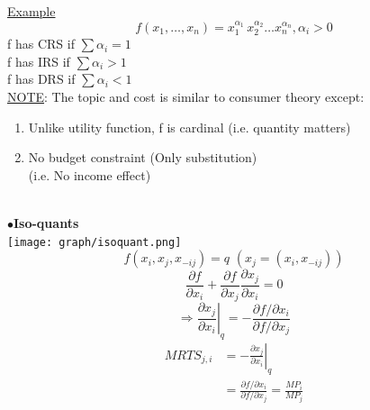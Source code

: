 \documentclass[letterpaper,13pt,single,pdftex]{scrartcl}
\begin{document}
\underline{Example}
\[f(x_1,\dots,x_n) = x_1^{\alpha_1}\,x_2^{\alpha_2}\dots x_n^{\alpha_n}, \alpha_i>0\]
f has CRS if $\sum \alpha_i = 1$\\
f has IRS if $\sum \alpha_i > 1$\\
f has DRS if $\sum \alpha_i < 1$\\
\underline{NOTE}: The topic and cost is similar to consumer theory except:
\begin{enumerate}
     \item Unlike utility function, f is cardinal (i.e. quantity matters)
     \item No budget constraint (Only substitution)\\
         (i.e. No income effect)
\end{enumerate}
\\
$\bullet$\textbf{Iso-quants}\\
\texttt{[image: graph/isoquant.png]}
\[    f(x_i,x_j,x_{-ij}) = q \,\, (x_{j} = (x_i,x_{-ij}))\]
\[\frac{\partial f}{\partial x_i} +\frac{\partial f}{\partial x_j}\frac{\partial x_j}{\partial x_i} = 0\]
\[\Rightarrow {\left. {\frac{\partial x_j}{\partial x_i}} \right|_q} = -\frac{\partial f/\partial x_i}{\partial f/\partial x_j}\]
\begin{align*}
        MRTS_{j,i} &= -\left. {\frac{\partial x_j}{\partial x_i}} \right|_q\\
        &=\frac{\partial f/\partial x_i}{\partial f/\partial x_j} = \frac{MP_i}{MP_j}
\end{align*}
\end{document}
